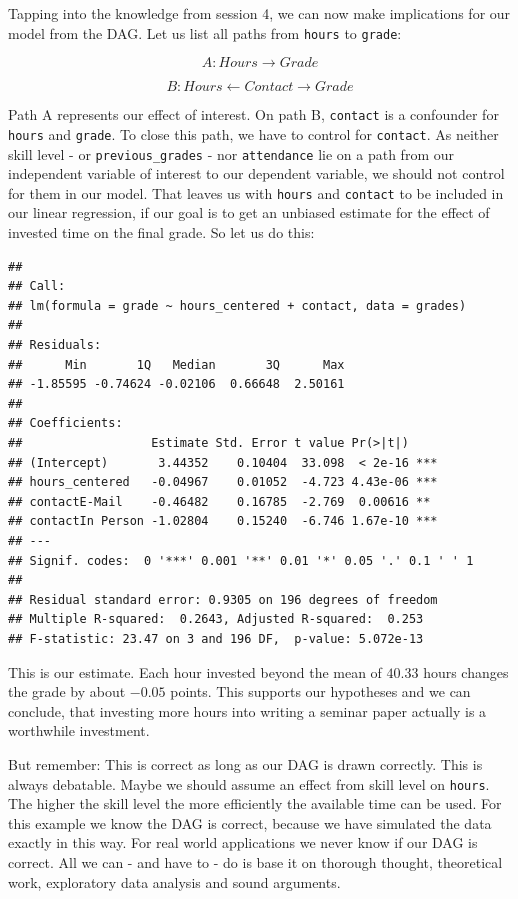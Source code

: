 \documentclass[
]{book}
\begin{document}
Tapping into the knowledge from session 4, we can now make implications for our
model from the DAG. Let us list all paths from \texttt{hours} to \texttt{grade}:

\[A: Hours \rightarrow Grade\]

\[B: Hours \leftarrow Contact \rightarrow Grade\]

Path A represents our effect of interest. On path B, \texttt{contact} is a confounder
for \texttt{hours} and \texttt{grade}. To close this path, we have to control for \texttt{contact}.
As neither skill level - or \texttt{previous\_grades} - nor \texttt{attendance} lie on a path
from our independent variable of interest to our dependent variable, we should
not control for them in our model.
That leaves us with \texttt{hours} and \texttt{contact} to be included in our linear
regression, if our goal is to get an unbiased estimate for the effect of
invested time on the final grade. So let us do this:

\begin{verbatim}
## 
## Call:
## lm(formula = grade ~ hours_centered + contact, data = grades)
## 
## Residuals:
##      Min       1Q   Median       3Q      Max 
## -1.85595 -0.74624 -0.02106  0.66648  2.50161 
## 
## Coefficients:
##                  Estimate Std. Error t value Pr(>|t|)    
## (Intercept)       3.44352    0.10404  33.098  < 2e-16 ***
## hours_centered   -0.04967    0.01052  -4.723 4.43e-06 ***
## contactE-Mail    -0.46482    0.16785  -2.769  0.00616 ** 
## contactIn Person -1.02804    0.15240  -6.746 1.67e-10 ***
## ---
## Signif. codes:  0 '***' 0.001 '**' 0.01 '*' 0.05 '.' 0.1 ' ' 1
## 
## Residual standard error: 0.9305 on 196 degrees of freedom
## Multiple R-squared:  0.2643, Adjusted R-squared:  0.253 
## F-statistic: 23.47 on 3 and 196 DF,  p-value: 5.072e-13
\end{verbatim}

This is our estimate. Each hour invested beyond the mean of \(40.33\) hours
changes the grade by about \(-0.05\) points. This supports our hypotheses and we
can conclude, that investing more hours into writing a seminar paper actually
is a worthwhile investment.

But remember: This is correct as long as our DAG is drawn correctly. This is
always debatable. Maybe we should assume an effect from skill level on \texttt{hours}.
The higher the skill level the more efficiently the available time can be used.
For this example we know the DAG is correct, because we have simulated the data
exactly in this way. For real world applications we never know if our DAG is
correct. All we can - and have to - do is base it on thorough thought,
theoretical work, exploratory data analysis and sound arguments.
\end{document}
